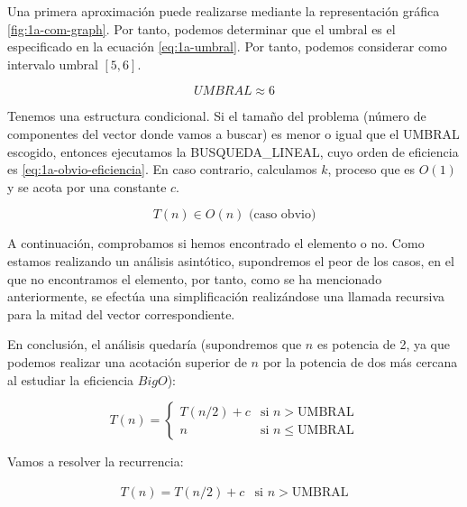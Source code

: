 Una primera aproximación puede realizarse mediante la representación gráfica \ref{fig:1a-com-graph}. Por tanto, podemos
determinar que el umbral es el especificado en la ecuación \ref{eq:1a-umbral}. Por tanto, podemos considerar como intervalo
umbral $[5,6]$. 

\begin{equation}
	UMBRAL \approx 6
	\label{eq:1a-umbral}
\end{equation}


Tenemos una estructura condicional. Si el tamaño del problema (número de componentes del vector donde 
vamos a buscar) es menor o igual que el UMBRAL escogido, entonces ejecutamos la BUSQUEDA\_LINEAL, cuyo orden de eficiencia es \ref{eq:1a-obvio-eficiencia}. 
En caso contrario, calculamos $k$, proceso que es $O(1)$ y se acota por una constante $c$. 

\begin{equation}
	\boxed{T(n) \in O (n)} \text{ (caso obvio)}
	\label{eq:1a-obvio-eficiencia}
\end{equation}

A continuación, comprobamos si hemos encontrado el elemento o no. Como estamos realizando un análisis asintótico, supondremos
el peor de los casos, en el que no encontramos el elemento, por tanto, como se ha mencionado anteriormente,
se efectúa una simplificación realizándose una llamada recursiva para la mitad del vector correspondiente.

En conclusión, el análisis quedaría (supondremos que $n$ es potencia de 2, ya que podemos realizar una acotación 
superior de $n$ por la potencia de dos más cercana al estudiar la eficiencia $Big O$): 

\begin{equation}
    T(n) = \left\{ \begin{array}{lr} T(n/2) + c & \text{si } n > \text{UMBRAL}\\ n & \text{si } n \leqslant \text{UMBRAL} \end{array} \right.
    \label{eq:1a-efi-dyv-rec}
\end{equation}

Vamos a resolver la recurrencia:

\begin{equation}
    \begin{array}{lr}  T(n) =  T(n/2) + c & \text{si } n > \text{UMBRAL} \end{array}
    \label{eq:ejer1:efi-dyv}
\end{equation}

